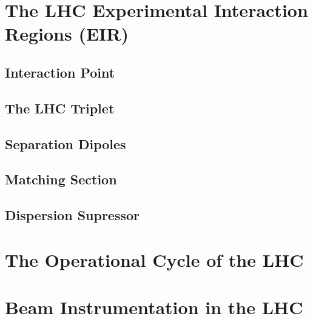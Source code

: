 
\section{The LHC Experimental Interaction Regions (EIR)}

\subsection{Interaction Point}

\subsection{The LHC Triplet}

\subsection{Separation Dipoles}

\subsection{Matching Section}

\subsection{Dispersion Supressor}


\section{The Operational Cycle of the LHC}


\section{Beam Instrumentation in the LHC}






